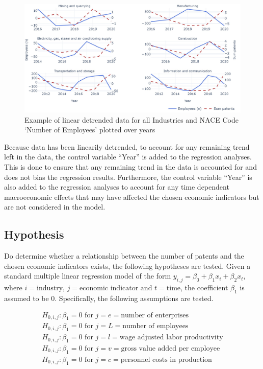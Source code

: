 \documentclass[
  11,
  a4paperpaper,
]{article}
\begin{document}
\begin{figure}[H]

{\centering \includegraphics{rieg2023_files/figure-pdf/fig-transformed-data-example-output-1.jpeg}

}

\caption{\label{fig-transformed-data-example}Example of linear detrended
data for all Industries and NACE Code `Number of Employees' plotted over
years}

\end{figure}

Because data has been linearily detrended, to account for any remaining
trend left in the data, the control variable ``Year'' is added to the
regression analyses. This is done to ensure that any remaining trend in
the data is accounted for and does not bias the regression results.
Furthermore, the control variable ``Year'' is also added to the
regression analyses to account for any time dependent macroeconomic
effects that may have affected the chosen economic indicators but are
not considered in the model.

\subsection{Hypothesis}\label{hypothesis}

Do determine whether a relationship between the number of patents and
the chosen economic indicators exists, the following hypotheses are
tested. Given a standard multiple linear regression model of the form
\(y_{i,j} = \beta_0 + \beta_1x_i + \beta_2x_t\), where
\(i=\text{industry, }j=\text{economic indicator }\text{and }t=\text{time}\),
the coefficient \(\beta_1\) is assumed to be \(0\). Specifically, the
following assumptions are tested.

\begin{align}
H_{0, i, j}: \beta_1 = 0\text{ for }j=e=\text{number of enterprises} \\
H_{0, i, j}: \beta_1 = 0\text{ for }j=L=\text{number of employees} \\
H_{0, i, j}: \beta_1 = 0\text{ for }j=l=\text{wage adjusted labor productivity} \\
H_{0, i, j}: \beta_1 = 0\text{ for }j=v=\text{gross value added per employee} \\
H_{0, i, j}: \beta_1 = 0\text{ for }j=c=\text{personnel costs in production}
\end{align}
\end{document}
